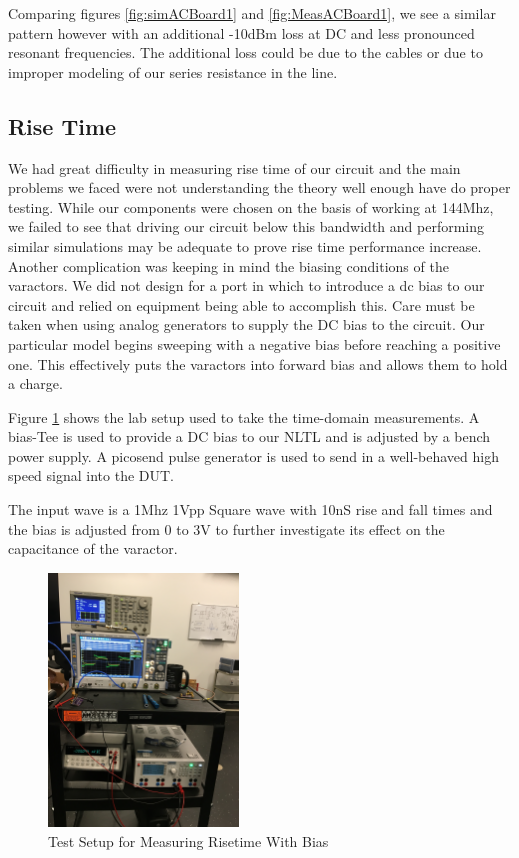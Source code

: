 \documentclass[journal]{IEEEtran} \usepackage[english]{babel}
\begin{document}
Comparing figures \ref{fig:simACBoard1} and \ref{fig:MeasACBoard1}, we see a
similar pattern however with an additional -10dBm loss at DC and less pronounced
resonant frequencies. The additional loss could be due to the cables or due to
improper modeling of our series resistance in the line. 


\subsection{Rise Time}\label{RiseTimeMeasResults}

We had great difficulty in measuring rise time of our circuit and the main
problems we faced were not understanding the theory well enough have do proper
testing. While our components were chosen on the basis of working at 144Mhz, we
failed to see that driving our circuit below this bandwidth and performing
similar simulations may be adequate to prove rise time performance increase.
Another complication was keeping in mind the biasing conditions of the
varactors. We did not design for a port in which to introduce a dc bias to our
circuit and relied on equipment being able to accomplish this. Care must be
taken when using analog generators to supply the DC bias to the circuit. Our
particular model begins sweeping with a negative bias before reaching a positive
one. This effectively puts the varactors into forward bias and allows them to
hold a charge.



Figure \ref{fig:SetupWBiasing} shows the lab setup used to take the time-domain
measurements. A bias-Tee is used to provide a DC bias to our NLTL and is
adjusted by a bench power supply. A picosend pulse generator is used to send
in a well-behaved high speed signal into the DUT.

The input wave is a 1Mhz 1Vpp Square wave with 10nS rise and fall times and the
bias is adjusted from 0 to 3V to further investigate its effect on the
capacitance of the varactor.

\begin{figure}[htb]
\centering
\includegraphics[width=0.45\textwidth,angle = -90]{SetupWithBiasing.JPG}
\caption{Test Setup for Measuring Risetime With Bias}
\label{fig:SetupWBiasing}
\end{figure}
\end{document}
